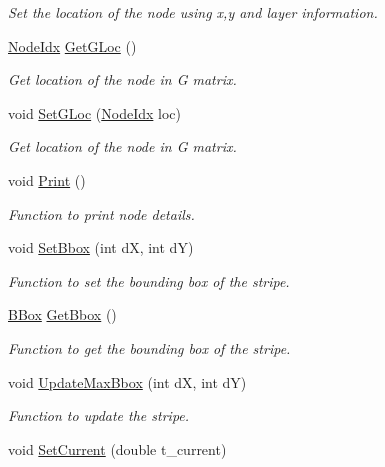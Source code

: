 \begin{DoxyCompactItemize}
\begin{DoxyCompactList}\small\item\em Set the location of the node using x,y and layer information. \end{DoxyCompactList}\item 
\hyperlink{node_8h_a5b622fe4354316a2f349615d150ae998}{Node\+Idx} \hyperlink{classNode_ad65d1c171a8fd20ef1a55ed040f11b75}{Get\+G\+Loc} ()
\begin{DoxyCompactList}\small\item\em Get location of the node in G matrix. \end{DoxyCompactList}\item 
void \hyperlink{classNode_a28572563d5947aa39b51b4c0f848e432}{Set\+G\+Loc} (\hyperlink{node_8h_a5b622fe4354316a2f349615d150ae998}{Node\+Idx} loc)
\begin{DoxyCompactList}\small\item\em Get location of the node in G matrix. \end{DoxyCompactList}\item 
void \hyperlink{classNode_a297f77156d63d571f7014c78f79841af}{Print} ()
\begin{DoxyCompactList}\small\item\em Function to print node details. \end{DoxyCompactList}\item 
void \hyperlink{classNode_ace2ee184ee4290c20cffc937435de6fc}{Set\+Bbox} (int dX, int dY)
\begin{DoxyCompactList}\small\item\em Function to set the bounding box of the stripe. \end{DoxyCompactList}\item 
\hyperlink{node_8h_acf0ff4a0bb7e0c9b5900382cbd2aa614}{B\+Box} \hyperlink{classNode_a4a5391ab70a61e5bf4d2daef056a434c}{Get\+Bbox} ()
\begin{DoxyCompactList}\small\item\em Function to get the bounding box of the stripe. \end{DoxyCompactList}\item 
void \hyperlink{classNode_a58172b29bbb26738beb36ea9c4a2f448}{Update\+Max\+Bbox} (int dX, int dY)
\begin{DoxyCompactList}\small\item\em Function to update the stripe. \end{DoxyCompactList}\item 
void \hyperlink{classNode_a359b49b9f2790426c97be364f76ce9a2}{Set\+Current} (double t\+\_\+current)

\end{DoxyCompactItemize}
